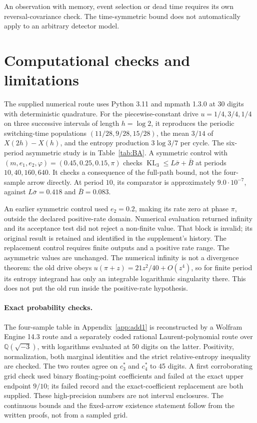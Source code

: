 \documentclass[10pt]{article}
\theoremstyle{definition}
\DeclareMathOperator{\KL}{KL}
\begin{document}
An observation with memory, event selection or dead time requires its own
reversal-covariance check. The time-symmetric bound does not automatically
apply to an arbitrary detector model.

\section{Computational checks and limitations}
\label{sec:verification}

The supplied numerical route uses Python 3.11 and mpmath 1.3.0 at
30 digits with deterministic quadrature. For the piecewise-constant drive
\(u=1/4,3/4,1/4\) on three successive intervals of length \(h=\log2\),
it reproduces the periodic switching-time populations
\((11/28,9/28,15/28)\), the mean \(3/14\) of \(X(2h)-X(h)\), and
the entropy production \(3\log3/7\) per cycle. The six-period asymmetric
study is in Table~\ref{tab:BA}. A symmetric control with
\((m,e_1,e_2,\varphi)=(0.45,0.25,0.15,\pi)\) checks
\(\KL_3\leq L\bar\sigma+\bar B\) at periods \(10,40,160,640\).
It checks a consequence of the full-path bound, not the four-sample
arrow directly. At period \(10\), its comparator is approximately
\(9.0\cdot10^{-7}\), against \(L\bar\sigma=0.418\) and
\(\bar B=0.083\).

An earlier symmetric control used \(e_2=0.2\), making its rate zero at
phase \(\pi\), outside the declared positive-rate domain. Numerical
evaluation returned infinity and its acceptance test did not reject
a non-finite value. That block is invalid;
its original result is retained and identified in the supplement's
history. The replacement control requires finite outputs and a positive
rate range. The asymmetric values are unchanged.
The numerical infinity is not a divergence theorem: the old drive obeys
\(u(\pi+z)=21z^2/40+O(z^4)\), so for finite period its entropy integrand
has only an integrable logarithmic singularity there. This does not put
the old run inside the positive-rate hypothesis.

\paragraph{Exact probability checks.}
\label{sec:add1check}
The four-sample table in Appendix~\ref{app:add1} is reconstructed by
a Wolfram Engine 14.3 route and a separately coded rational
Laurent-polynomial route over \(\mathbb Q(\sqrt{-3})\), with logarithms
evaluated at 50 digits on the latter. Positivity, normalization, both
marginal identities and the strict relative-entropy inequality are checked.
The two routes agree on \(c_3^*\) and \(c_4^*\) to 45 digits.
A first corroborating grid check used binary floating-point coefficients
and failed at the exact upper endpoint \(9/10\); its failed record and
the exact-coefficient replacement are both supplied.
These high-precision numbers are not interval enclosures. The
continuous bounds and the fixed-arrow existence statement follow from
the written proofs, not from a sampled grid.
\end{document}
